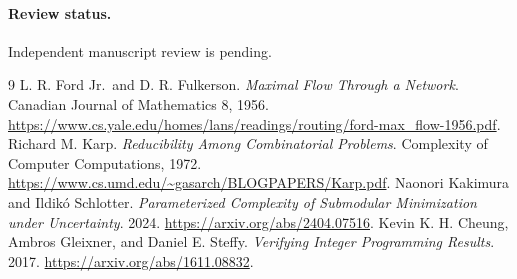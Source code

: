\documentclass[11pt]{article}
\begin{document}
\paragraph{Review status.} Independent manuscript review is pending.

\begin{thebibliography}{9}
 L. R. Ford Jr.\ and D. R. Fulkerson.
\emph{Maximal Flow Through a Network}.
Canadian Journal of Mathematics 8, 1956.
\url{https://www.cs.yale.edu/homes/lans/readings/routing/ford-max_flow-1956.pdf}.
 Richard M. Karp.
\emph{Reducibility Among Combinatorial Problems}.
Complexity of Computer Computations, 1972.
\url{https://www.cs.umd.edu/~gasarch/BLOGPAPERS/Karp.pdf}.
 Naonori Kakimura and Ildikó Schlotter.
\emph{Parameterized Complexity of Submodular Minimization under Uncertainty}.
2024. \url{https://arxiv.org/abs/2404.07516}.
 Kevin K. H. Cheung, Ambros Gleixner, and
Daniel E. Steffy. \emph{Verifying Integer Programming Results}.
2017. \url{https://arxiv.org/abs/1611.08832}.
\end{thebibliography}
\end{document}
